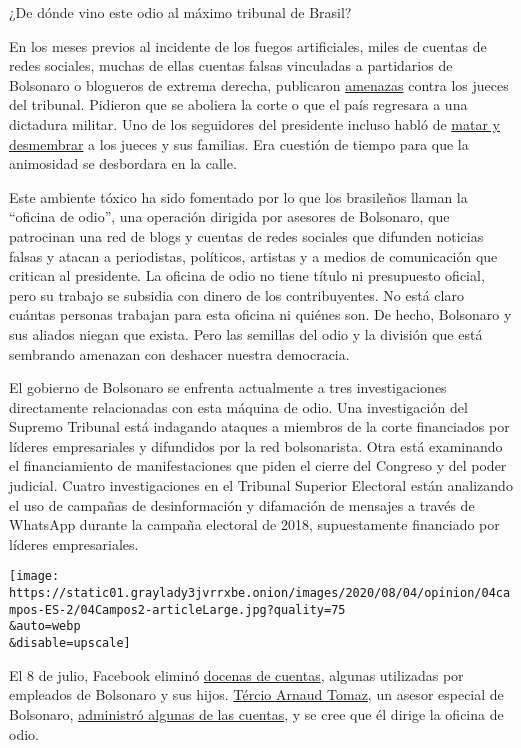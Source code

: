 ¿De dónde vino este odio al máximo tribunal de Brasil?

En los meses previos al incidente de los fuegos artificiales, miles de
cuentas de redes sociales, muchas de ellas cuentas falsas vinculadas a
partidarios de Bolsonaro o blogueros de extrema derecha, publicaron
\href{https://www1.folha.uol.com.br/poder/2020/05/sara-winter-xinga-moraes-diz-querer-trocar-socos-com-ele-e-promete-inferniza-lo.shtml}{amenazas}
contra los jueces del tribunal. Pidieron que se aboliera la corte o que
el país regresara a una dictadura militar. Uno de los seguidores del
presidente incluso habló de
\href{https://g1.globo.com/politica/noticia/2020/06/17/moraes-vota-pela-legalidade-e-continuidade-do-inquerito-das-fake-news.ghtml}{matar
y desmembrar} a los jueces y sus familias. Era cuestión de tiempo para
que la animosidad se desbordara en la calle.

Este ambiente tóxico ha sido fomentado por lo que los brasileños llaman
la ``oficina de odio'', una operación dirigida por asesores de
Bolsonaro, que patrocinan una red de blogs y cuentas de redes sociales
que difunden noticias falsas y atacan a periodistas, políticos, artistas
y a medios de comunicación que critican al presidente. La oficina de
odio no tiene título ni presupuesto oficial, pero su trabajo se subsidia
con dinero de los contribuyentes. No está claro cuántas personas
trabajan para esta oficina ni quiénes son. De hecho, Bolsonaro y sus
aliados niegan que exista. Pero las semillas del odio y la división que
está sembrando amenazan con deshacer nuestra democracia.

El gobierno de Bolsonaro se enfrenta actualmente a tres investigaciones
directamente relacionadas con esta máquina de odio. Una investigación
del Supremo Tribunal está indagando ataques a miembros de la corte
financiados por líderes empresariales y difundidos por la red
bolsonarista. Otra está examinando el financiamiento de manifestaciones
que piden el cierre del Congreso y del poder judicial. Cuatro
investigaciones en el Tribunal Superior Electoral están analizando el
uso de campañas de desinformación y difamación de mensajes a través de
WhatsApp durante la campaña electoral de 2018, supuestamente financiado
por líderes empresariales.

\texttt{[image: https://static01.graylady3jvrrxbe.onion/images/2020/08/04/opinion/04campos-ES-2/04Campos2-articleLarge.jpg?quality=75\\\&auto=webp\\\&disable=upscale]}

El 8 de julio, Facebook eliminó
\href{https://www1.folha.uol.com.br/poder/2020/07/facebook-remove-contas-falsas-ligadas-aos-bolsonaros-e-ao-gabinete-da-presidencia.shtml}{docenas
de cuentas}, algunas utilizadas por empleados de Bolsonaro y sus hijos.
\href{https://elpais.com/internacional/2020-07-10/facebook-rompe-la-oficina-del-odio-una-red-de-88-cuentas-de-apoyo-a-jair-bolsonaro.html}{Tércio
Arnaud Tomaz}, un asesor especial de Bolsonaro,
\href{https://apnews.com/0c58cccec2004bf250c8dab38172cbc9}{administró
algunas de las cuentas}, y se cree que él dirige la oficina de odio.

